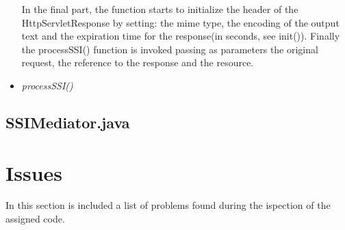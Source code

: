 \documentclass[11pt,titlepage]{article} %
\begin{document}
\begin{itemize}
      In the final part, the function starts to initialize the header of the HttpServletResponse by setting:
      the mime type, the encoding of the output text and the expiration time for the response(in seconds, see init()).\newline
      Finally the processSSI() function is invoked passing as parameters the original request, the reference to the response and the resource.
      
      \newpage
    \item \textit{processSSI()}

  \end{itemize}

\subsection{SSIMediator.java}



\section{Issues}
In this section is included a list of problems found during the ispection of the assigned code.
\end{document}
